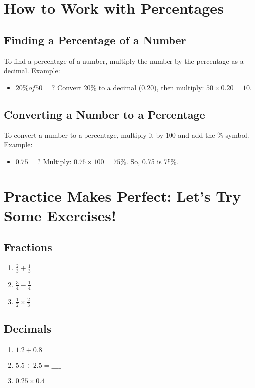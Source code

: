 \section{How to Work with Percentages}
\subsection{Finding a Percentage of a Number}
To find a percentage of a number, multiply the number by the percentage as a decimal. Example:
\begin{itemize}
    \item $20\% of 50 = ?$ Convert 20\% to a decimal (0.20), then multiply: $50 \times 0.20 = 10$.
\end{itemize}

\subsection{Converting a Number to a Percentage}
To convert a number to a percentage, multiply it by 100 and add the \% symbol. Example:
\begin{itemize}
    \item $0.75 = ?$ Multiply: $0.75 \times 100 = 75\%$. So, 0.75 is 75\%.
\end{itemize}

\section{Practice Makes Perfect: Let’s Try Some Exercises!}
\subsection{Fractions}
\begin{enumerate}
    \item $\frac{2}{3} + \frac{1}{3} = \_\_\_\_$
    \item $\frac{3}{4} - \frac{1}{4} = \_\_\_\_$
    \item $\frac{1}{2} \times \frac{2}{3} = \_\_\_\_$
\end{enumerate}

\subsection{Decimals}
\begin{enumerate}
    \item $1.2 + 0.8 = \_\_\_\_$
    \item $5.5 \div 2.5 = \_\_\_\_$
    \item $0.25 \times 0.4 = \_\_\_\_$
\end{enumerate}

